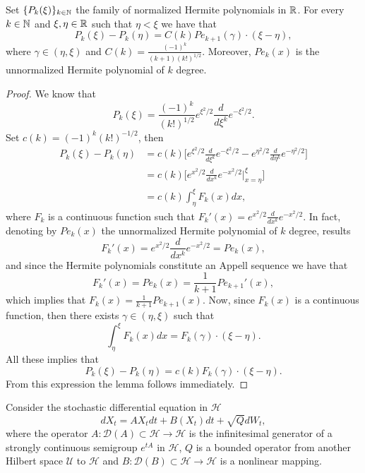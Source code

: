 \documentclass[review, onefignum, onetabnum]{siamart171218}
\begin{document}
\begin{lemma}\label{le-s3-1}
 Set $\{P_k(\xi)\}_{k\in {\mathbb N}}$ the family of normalized Hermite polynomials in
${\mathbb R}$. For every $k\in{\mathbb N}$ and $\xi,
 \eta\in{\mathbb R}$ such that
 $\eta<\xi$ we have that
 \begin{equation}
  P_k(\xi)-P_k(\eta)= C(k)  Pe_{k+1}(\gamma) \cdot (\xi-\eta), \label{Pk-dif}
 \end{equation}
where $\gamma\in (\eta,\xi)$ and $C(k)=\frac{(-1)^k}{(k+1)(k!)^{1/2}} $.
Moreover, $Pe_k(x)$ is the
unnormalized Hermite polynomial of $k$ degree.
\end{lemma}
\begin{proof}
 We know that
 $$
 P_k(\xi)=\frac{(-1)^k}{(k!)^{1/2}} e^{\xi^2/2}\frac{d}{d\xi^k}e^{-\xi^2/2}.
 $$
 Set $c(k)=(-1)^k (k!)^{-1/2}$, then
\begin{align*}
    P_k(\xi)-P_k(\eta)
        &=c(k)
        \Big[
            e^{\xi^2/2}
            \frac{d}{d\xi^k} e^{-\xi ^ 2/2} - e^{\eta^2/2}
            \frac{d}{d\eta^k} e^{-\eta ^ 2/2}
        \Big] 
        \\
    & =c(k)
        \Bigg[
            e^{x^2/2} \frac{d}{dx^k} e^{-x^2/2}
        \Big|_{x=\eta}^\xi\Bigg]
        \\
    & = c(k) \int_{\eta}^\xi F_k(x) dx,
\end{align*}
where $F_k$ is a continuous function such that
$F_k'(x)=e^{x^2/2}\frac{d}{dx^k}e^{-x^2/2}$. In fact, denoting by $Pe_k(x)$
the
unnormalized Hermite polynomial of $k$ degree, results
$$
    F_k'(x)=e^{x^2/2}\frac{d}{dx^k}e^{-x^2/2}= Pe_k(x),
$$
and since the Hermite polynomials constitute an Appell sequence we have that
$$
    F_k'(x)=Pe_k(x)=\frac{1}{k+1} Pe_{k+1}'(x),
$$
which implies that $F_k(x)=\frac{1}{k+1} Pe_{k+1}(x)$. Now, since $F_k(x)$ is
a continuous function, then there exists
$\gamma\in (\eta,\xi)$ such that
$$
    \int_{\eta}^\xi F_k(x) dx = F_k(\gamma)\cdot (\xi-\eta).
$$
 All these implies that
\begin{equation*}
    P_k(\xi)-P_k(\eta)= c(k) F_k(\gamma) \cdot (\xi-\eta).
\end{equation*}
    From this expression the lemma follows immediately.
\end{proof}

Consider the stochastic differential equation in $\mathcal{H}$
\begin{equation}
\label{P1s2.1}
 dX_t=AX_tdt+B(X_t)dt+\sqrt{Q}dW_t,
\end{equation}
where the operator $A:\mathcal{D}(A)\subset \mathcal{H}\rightarrow
\mathcal{H}$ is the infinitesimal generator of a strongly
continuous semigroup $e^{tA}$ in $\mathcal{H}$, $Q$ is a bounded operator from
another Hilbert space $\mathcal{U}$ to $\mathcal{H}$
and $B:\mathcal{D}(B)\subset \mathcal{H}\rightarrow \mathcal{H}$ is a
nonlinear mapping.
\end{document}
